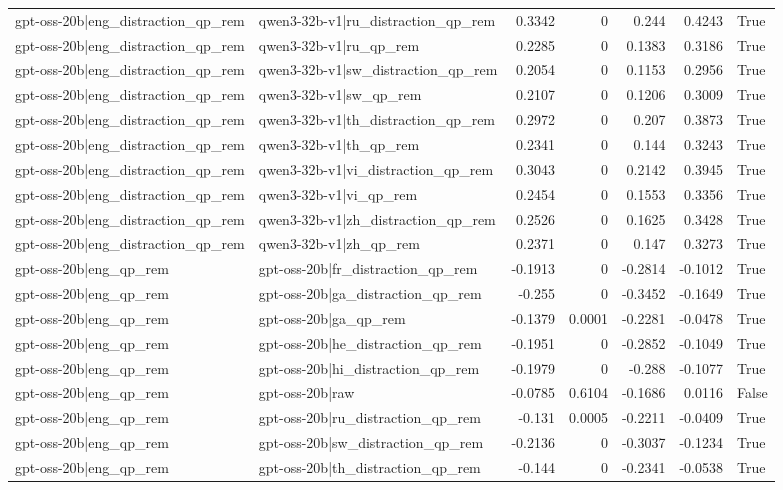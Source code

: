 \begin{table}
\begin{tabular}{l l r r r r l}
gpt-oss-20b|eng_distraction_qp_rem & qwen3-32b-v1|ru_distraction_qp_rem & 0.3342 & 0 & 0.244 & 0.4243 & True \\
gpt-oss-20b|eng_distraction_qp_rem & qwen3-32b-v1|ru_qp_rem & 0.2285 & 0 & 0.1383 & 0.3186 & True \\
gpt-oss-20b|eng_distraction_qp_rem & qwen3-32b-v1|sw_distraction_qp_rem & 0.2054 & 0 & 0.1153 & 0.2956 & True \\
gpt-oss-20b|eng_distraction_qp_rem & qwen3-32b-v1|sw_qp_rem & 0.2107 & 0 & 0.1206 & 0.3009 & True \\
gpt-oss-20b|eng_distraction_qp_rem & qwen3-32b-v1|th_distraction_qp_rem & 0.2972 & 0 & 0.207 & 0.3873 & True \\
gpt-oss-20b|eng_distraction_qp_rem & qwen3-32b-v1|th_qp_rem & 0.2341 & 0 & 0.144 & 0.3243 & True \\
gpt-oss-20b|eng_distraction_qp_rem & qwen3-32b-v1|vi_distraction_qp_rem & 0.3043 & 0 & 0.2142 & 0.3945 & True \\
gpt-oss-20b|eng_distraction_qp_rem & qwen3-32b-v1|vi_qp_rem & 0.2454 & 0 & 0.1553 & 0.3356 & True \\
gpt-oss-20b|eng_distraction_qp_rem & qwen3-32b-v1|zh_distraction_qp_rem & 0.2526 & 0 & 0.1625 & 0.3428 & True \\
gpt-oss-20b|eng_distraction_qp_rem & qwen3-32b-v1|zh_qp_rem & 0.2371 & 0 & 0.147 & 0.3273 & True \\
gpt-oss-20b|eng_qp_rem & gpt-oss-20b|fr_distraction_qp_rem & -0.1913 & 0 & -0.2814 & -0.1012 & True \\
gpt-oss-20b|eng_qp_rem & gpt-oss-20b|ga_distraction_qp_rem & -0.255 & 0 & -0.3452 & -0.1649 & True \\
gpt-oss-20b|eng_qp_rem & gpt-oss-20b|ga_qp_rem & -0.1379 & 0.0001 & -0.2281 & -0.0478 & True \\
gpt-oss-20b|eng_qp_rem & gpt-oss-20b|he_distraction_qp_rem & -0.1951 & 0 & -0.2852 & -0.1049 & True \\
gpt-oss-20b|eng_qp_rem & gpt-oss-20b|hi_distraction_qp_rem & -0.1979 & 0 & -0.288 & -0.1077 & True \\
gpt-oss-20b|eng_qp_rem & gpt-oss-20b|raw & -0.0785 & 0.6104 & -0.1686 & 0.0116 & False \\
gpt-oss-20b|eng_qp_rem & gpt-oss-20b|ru_distraction_qp_rem & -0.131 & 0.0005 & -0.2211 & -0.0409 & True \\
gpt-oss-20b|eng_qp_rem & gpt-oss-20b|sw_distraction_qp_rem & -0.2136 & 0 & -0.3037 & -0.1234 & True \\
gpt-oss-20b|eng_qp_rem & gpt-oss-20b|th_distraction_qp_rem & -0.144 & 0 & -0.2341 & -0.0538 & True \\

\end{tabular}
\end{table}
